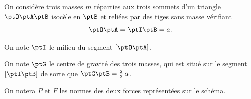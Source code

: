 


\hauteurLargeurCadreReponse		{8mm}{5cm}
\typeEntrainement				{} %
\initialisationEntrainement




                                \initialisationPartieGauche %
On considère trois masses $m$ réparties aux trois sommets d'un triangle $\ptO\ptA\ptB$ isocèle en $\ptB$ et reliées par des tiges sans masse vérifiant 
\[
\ptO\ptA=\ptI\ptB=a.
\]

On note $\ptI$ le milieu du segment $[\ptO\ptA]$. 

On note $\ptG$ le centre de gravité des trois masses, qui est situé sur le segment $[\ptI\ptB]$ de sorte que $\ptG\ptB = \frac23\,a$. 

On notera $P$ et $F$ les normes des deux forces représentées sur le schéma.



